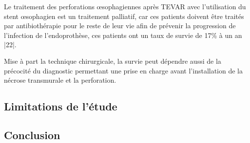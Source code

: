 \documentclass[./tfe.tex]{subfiles}
\begin{document}
Le traitement des perforations œsophagiennes après TEVAR avec l'utilisation du stent œsophagien est un traitement palliatif, car ces patients doivent être traités par antibiothérapie pour le reste de leur vie afin de prévenir la progression de l'infection de l'endoprothèse, ces patients ont un taux de survie de 17\% à un an |22|.

Mise à part la technique chirurgicale, la survie peut dépendre aussi de la précocité du diagnostic permettant une prise en charge avant l’installation de la nécrose transmurale et la perforation.

\subsection*{Limitations de l’étude}


\subsection*{Conclusion}

\end{document}
